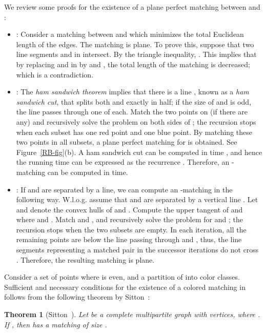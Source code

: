 \documentclass[11pt,a4paper]{article}
\newcommand{\CH}[1]{\text{}}
\newcommand{\Min}[2]{\text{\sf Min}}
\newcommand{\Cut}[2]{\text{\sf Cut}}
\newcommand{\Tangent}[2]{\text{\sf Tangent}}
\newtheorem{theorem}{Theorem}
\begin{document}
We review some proofs for the existence of a plane perfect matching between  and :
\begin{itemize}
\item {\Min{R}{B}:} Consider a matching  between  and  which minimizes the total Euclidean length of the edges. The matching  is plane. To prove this, suppose that two line segments  and  in  intersect. By the triangle inequality, . This implies that by replacing  and  in  by  and , the total length of the matching is decreased; which is a contradiction.

\item {\Cut{R}{B}:} The {\em ham sandwich theorem} implies that there is a line , known as a {\em ham sandwich cut}, that splits both  and  exactly in half; if the size of  and  is odd, the line passes through one of each. Match the two points on  (if there are any) and recursively solve the problem on both sides of ; the recursion stops when each subset has one red point and one blue point. By matching these two points in all subsets, a plane perfect matching for  is obtained. See Figure~\ref{RB-fig}(b). A ham sandwich cut can be computed in  time \cite{Lo1994}, and hence the running time can be expressed as the recurrence . Therefore, an -matching can be computed in  time. 

\item {\Tangent{R}{B}:} If  and  are separated by a line, we can compute an -matching in the following way. W.l.o.g. assume that  and  are separated by a vertical line . Let \CH{R} and \CH{B} denote the convex hulls of  and . Compute the upper tangent  of \CH{R} and \CH{B} where  and . Match  and , and recursively solve the problem for  and ; the recursion stops when the two subsets are empty. In each iteration, all the remaining points are below the line passing through  and , thus, the line segments representing a matched pair in the successor iterations do not cross . Therefore, the resulting matching is plane.
\end{itemize}

Consider a set  of  points where  is even, and a partition  of  into  color classes. Sufficient and necessary conditions for the existence of a colored matching in  follows from the following theorem by Sitton~\cite{Sitton1996}:

\begin{theorem}[Sitton~\cite{Sitton1996}]
\label{Sitton}
Let  be a complete multipartite graph with  vertices, where . If , then  has a matching of size . 
\end{theorem}
\end{document}
